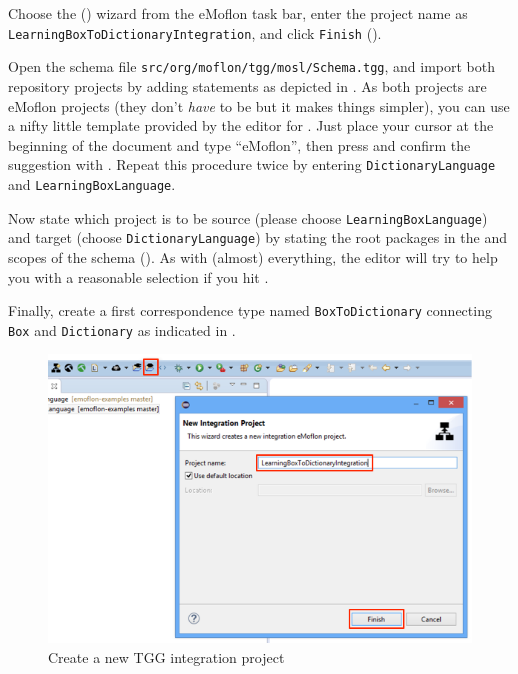 \begin{stepbystep}

\item Choose the  (\eMoflonCreateNewIntegrationProjectIcon) wizard from the eMoflon task bar, enter the project name as
\texttt{Learning\-Box\-To\-Dictionary\-In\-te\-gra\-tion}, and click \texttt{Finish} ().

\item Open the schema file \texttt{src/org/moflon/tgg/mosl/Schema.tgg}, and import both repository projects by adding  statements as depicted in .
As both projects are eMoflon projects (they don't \emph{have} to be but it makes things simpler), you can use a nifty little template provided by the editor for .
Just place your cursor at the beginning of the document and type \enquote{eMoflon}, then press  and confirm the suggestion with .
Repeat this procedure twice by entering \texttt{Dict\-io\-nary\-Lang\-uage} and \texttt{Lear\-ning\-Box\-Language}.

\item Now state which project is to be source (please choose \texttt{Learning\-Box\-Language}) and target (choose \texttt{Dictionary\-Language}) by stating the root packages in the  and  scopes of the schema ().
As with (almost) everything, the editor will try to help you with a reasonable selection if you hit . 

\item Finally, create a first correspondence type named \texttt{BoxToDictionary} connecting \texttt{Box} and \texttt{Dictionary} as indicated in .
\end{stepbystep}

\begin{figure}[htbp]
\begin{center}
  \includegraphics[width=\textwidth]{../../org.moflon.doc.handbook.04_tripleGraphTransformations/3_schema/newIntegrationProject}
  \caption{Create a new TGG integration project}  
  \label{intgPackage}
\end{center}
\end{figure}

